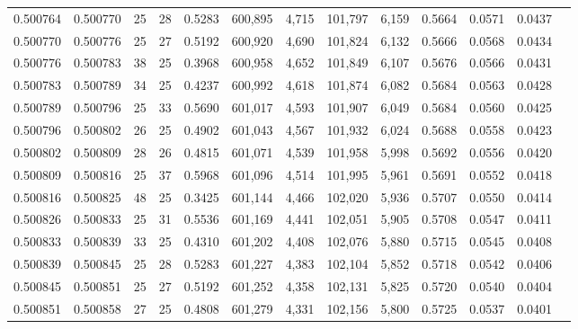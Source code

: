 \begin{tabular}{rrrrrrrrrrrrr}
0.500764 & 0.500770 &    25 &  28 &                                     0.5283 & 600,895 &   4,715 & 101,797 &   6,159 & 0.5664 & 0.0571 & 0.0437 \\
0.500770 & 0.500776 &    25 &  27 &                                     0.5192 & 600,920 &   4,690 & 101,824 &   6,132 & 0.5666 & 0.0568 & 0.0434 \\
0.500776 & 0.500783 &    38 &  25 &                                     0.3968 & 600,958 &   4,652 & 101,849 &   6,107 & 0.5676 & 0.0566 & 0.0431 \\
0.500783 & 0.500789 &    34 &  25 &                                     0.4237 & 600,992 &   4,618 & 101,874 &   6,082 & 0.5684 & 0.0563 & 0.0428 \\
0.500789 & 0.500796 &    25 &  33 &                                     0.5690 & 601,017 &   4,593 & 101,907 &   6,049 & 0.5684 & 0.0560 & 0.0425 \\
0.500796 & 0.500802 &    26 &  25 &                                     0.4902 & 601,043 &   4,567 & 101,932 &   6,024 & 0.5688 & 0.0558 & 0.0423 \\
0.500802 & 0.500809 &    28 &  26 &                                     0.4815 & 601,071 &   4,539 & 101,958 &   5,998 & 0.5692 & 0.0556 & 0.0420 \\
0.500809 & 0.500816 &    25 &  37 &                                     0.5968 & 601,096 &   4,514 & 101,995 &   5,961 & 0.5691 & 0.0552 & 0.0418 \\
0.500816 & 0.500825 &    48 &  25 &                                     0.3425 & 601,144 &   4,466 & 102,020 &   5,936 & 0.5707 & 0.0550 & 0.0414 \\
0.500826 & 0.500833 &    25 &  31 &                                     0.5536 & 601,169 &   4,441 & 102,051 &   5,905 & 0.5708 & 0.0547 & 0.0411 \\
0.500833 & 0.500839 &    33 &  25 &                                     0.4310 & 601,202 &   4,408 & 102,076 &   5,880 & 0.5715 & 0.0545 & 0.0408 \\
0.500839 & 0.500845 &    25 &  28 &                                     0.5283 & 601,227 &   4,383 & 102,104 &   5,852 & 0.5718 & 0.0542 & 0.0406 \\
0.500845 & 0.500851 &    25 &  27 &                                     0.5192 & 601,252 &   4,358 & 102,131 &   5,825 & 0.5720 & 0.0540 & 0.0404 \\
0.500851 & 0.500858 &    27 &  25 &                                     0.4808 & 601,279 &   4,331 & 102,156 &   5,800 & 0.5725 & 0.0537 & 0.0401 \\

\end{tabular}
